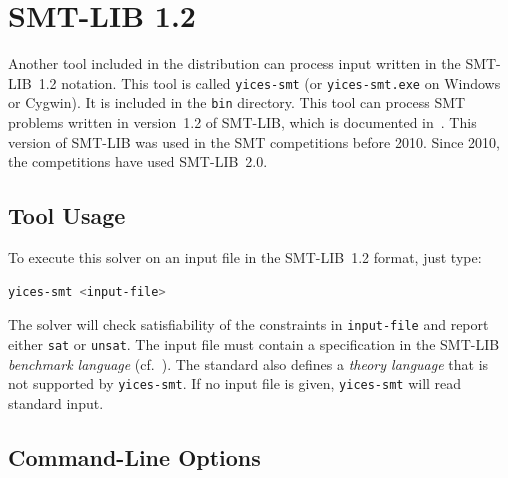 \documentclass[11pt,twoside,fleqn,openright,titlepage]{cslreport}
\begin{document}
\section{SMT-LIB 1.2}

Another tool included in the distribution can process input written in
the SMT-LIB~1.2 notation. This tool is called \texttt{yices-smt} (or
\texttt{yices-smt.exe} on Windows or Cygwin). It is included in the
\texttt{bin} directory.  This tool can process SMT problems written in
version~1.2 of SMT-LIB, which is documented
in~\cite{SMTLIB12:2006}. This version of SMT-LIB was used in the SMT
competitions before 2010.  Since 2010, the competitions have used
SMT-LIB~2.0.


\subsection{Tool Usage}

To execute this solver on an input file in the SMT-LIB~1.2 format, just type:
\begin{small}
\begin{lstlisting}[language=sh]
   yices-smt <input-file>
\end{lstlisting}
\end{small}
The solver will check satisfiability of the constraints in
\texttt{input-file} and report either \texttt{sat} or
\texttt{unsat}. The input file must contain a specification in the
SMT-LIB {\em benchmark language\/} (cf.~\cite{SMTLIB12:2006}). The
standard also defines a {\em theory language\/} that is not supported
by \texttt{yices-smt}. If no input file is given, \texttt{yices-smt}
will read standard input.


\subsection{Command-Line Options}
\end{document}
